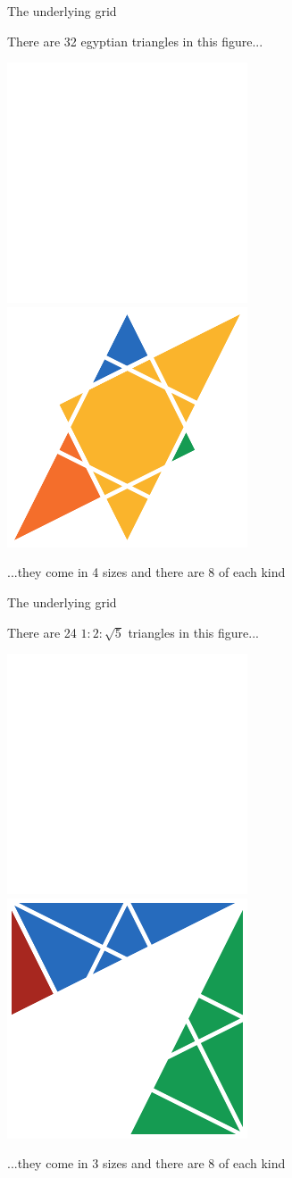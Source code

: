\documentclass[14pt]{beamer}
\begin{document}

    \begin{frame}{The underlying grid}
        \begin{center}
            There are 32 egyptian triangles in this figure...

            \bigskip \bigskip

            \includegraphics[height=18ex]{figures/figure002b.pdf}\qquad
            \includegraphics[height=18ex]{figures/figure002c.pdf}\\

            \bigskip \bigskip

            ...they come in 4 sizes and there are 8 of each kind
        \end{center}
    \end{frame}


    \begin{frame}{The underlying grid}
        \begin{center}
            There are 24 $1\!\!:\!\!2\!\!:\!\!\sqrt{5}$ triangles in this figure...

            \bigskip \bigskip

            \includegraphics[height=18ex]{figures/figure002b.pdf}\qquad
            \includegraphics[height=18ex]{figures/figure002d.pdf}\\

            \bigskip \bigskip

            ...they come in 3 sizes and there are 8 of each kind
        \end{center}
    \end{frame}
\end{document}
